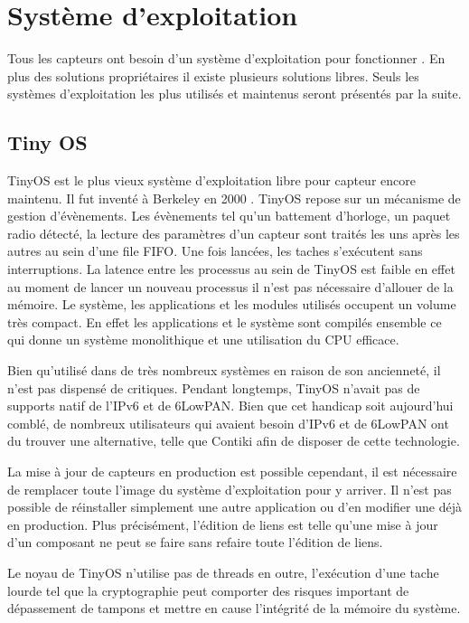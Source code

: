 \section{Système d'exploitation}

Tous les capteurs ont besoin d'un système d'exploitation pour fonctionner
\cite{dunkels09operating, dutta12operating}.  En plus des solutions
propriétaires il existe plusieurs solutions libres.  Seuls les systèmes
d'exploitation les plus utilisés et maintenus seront présentés par la suite.

\subsection{Tiny OS}

TinyOS est le plus vieux système d'exploitation libre pour capteur encore
maintenu. Il fut inventé à Berkeley en 2000 \cite{Levis04tinyos:an,
Hill00systemarchitecture}. TinyOS repose sur un mécanisme de gestion
d'évènements. Les évènements tel qu'un battement d'horloge, un paquet radio
détecté, la lecture des paramètres d'un capteur sont traités les uns après les
autres au sein d'une file FIFO. Une fois lancées, les taches s'exécutent sans
interruptions.  La latence entre les processus au sein de TinyOS est faible en
effet au moment de lancer un nouveau processus il n'est pas nécessaire
d'allouer de la mémoire. Le système, les applications et les modules utilisés
occupent un volume très compact.  En effet les applications et le système sont
compilés ensemble ce qui donne un système monolithique et une utilisation du CPU
efficace.

 Bien qu'utilisé dans de très nombreux systèmes en raison de son ancienneté, il
n'est pas dispensé de critiques. Pendant longtemps, TinyOS n'avait pas de
supports natif de l'IPv6 et de 6LowPAN. Bien que cet handicap soit aujourd'hui
comblé, de nombreux utilisateurs qui avaient besoin d'IPv6 et de 6LowPAN ont du
trouver une alternative, telle que Contiki afin de disposer de cette
technologie.

La mise à jour de capteurs en production est possible cependant, il est
nécessaire de remplacer toute l'image du système d'exploitation pour y arriver.
Il n'est pas possible de réinstaller simplement une autre application ou d'en
modifier une déjà en production. Plus précisément, l'édition de liens est telle
qu'une mise à jour d'un composant ne peut se faire sans refaire toute l'édition
de liens.

Le noyau de TinyOS n'utilise pas de threads en outre, l'exécution d'une tache
lourde tel que la cryptographie peut comporter des risques important de
dépassement de tampons et mettre en cause l'intégrité de la mémoire du système.

